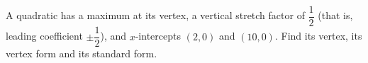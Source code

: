 A quadratic has a maximum at its vertex, a vertical stretch factor of $\dfrac12$ (that is, leading coefficient $\pm\dfrac12$), and $x$-intercepts $(2,0)$ and $(10,0)$. Find its vertex, its vertex form and its standard form.
